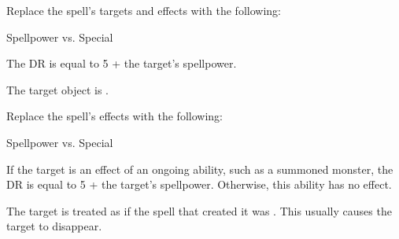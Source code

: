


Replace the spell's targets and effects with the following:
\begin{spellcontent}

\begin{augmenttargetinginfo}




\end{augmenttargetinginfo}


\begin{augmenteffects}




\begin{spellattack}{Spellpower vs. Special}


\spellspecial
The DR is equal to 5 + the target's spellpower.



\hit
The target object is .



\end{spellattack}





\end{augmenteffects}

\end{spellcontent}








Replace the spell's effects with the following:
\begin{spellcontent}

\begin{augmenteffects}




\begin{spellattack}{Spellpower vs. Special}


\spellspecial
If the target is an effect of an ongoing  ability, such as a summoned monster, the DR is equal to 5 + the target's spellpower.
Otherwise, this ability has no effect.



\hit
The target is treated as if the spell that created it was .
This usually causes the target to disappear.



\end{spellattack}





\end{augmenteffects}

\end{spellcontent}





